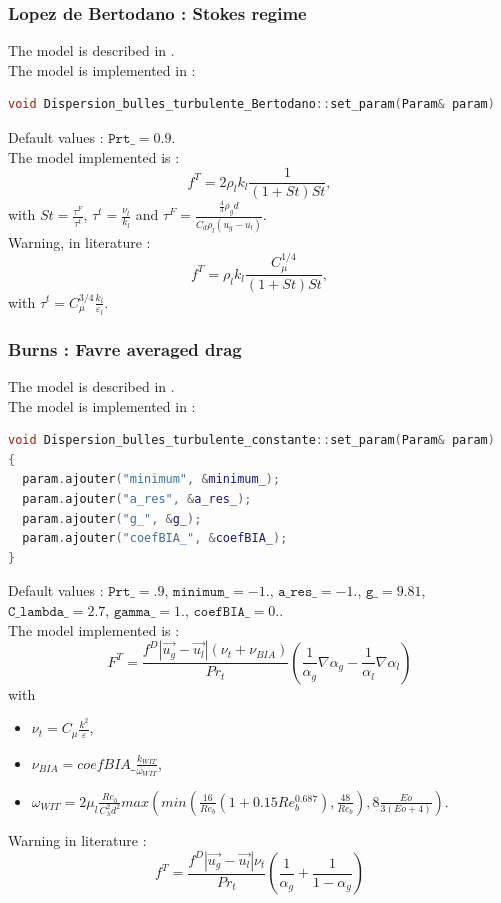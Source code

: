 %
\subsubsection{Lopez de Bertodano : Stokes regime}
The model is described in \textcite{LOPEZDEBERTODANO199865}.\\
The model is implemented in :
\begin{lstlisting}[language=c++]
void Dispersion_bulles_turbulente_Bertodano::set_param(Param& param)
\end{lstlisting}
Default values : $\texttt{Prt\_} = 0.9$.\\
The model implemented is :
\begin{equation}
   f^{T}=2\rho_lk_l\frac{1}{(1+St)St},
\end{equation}
with $St=\frac{\tau^F}{\tau^t}$, $\tau^t=\frac{\nu_t}{k_l}$ and $\tau^F=\frac{\frac{4}{3}\rho_g d}{C_d\rho_l(u_g-u_l)}$.\\
{\color{red} Warning}, in literature :
\begin{equation}
   f^{T}=\rho_lk_l\frac{C_{\mu}^{1/4}}{(1+St)St},
\end{equation}
with $\tau^t=C_{\mu}^{3/4}\frac{k_l}{\varepsilon_l}$.

%
\subsubsection{Burns : Favre averaged drag}
The model is described in \textcite{burns2004favre}.\\
The model is implemented in :
\begin{lstlisting}[language=c++]
void Dispersion_bulles_turbulente_constante::set_param(Param& param)
{
  param.ajouter("minimum", &minimum_);
  param.ajouter("a_res", &a_res_);
  param.ajouter("g_", &g_);
  param.ajouter("coefBIA_", &coefBIA_);
}
\end{lstlisting}
Default values :  $\texttt{Prt\_} = .9 $, $\texttt{minimum\_} = -1.$, $\texttt{a\_res\_} = -1.$, $\texttt{g\_} = 9.81$, $\texttt{C\_lambda\_} = 2.7$, $\texttt{gamma\_} = 1.$, $\texttt{coefBIA\_} = 0.$.\\
The model implemented is :
\begin{equation}
   F^{T}=\frac{f^D|\vec{u_g}-\vec{u_l}|(\nu_t+\nu_{BIA})}{Pr_t}(\frac{1}{\alpha_g}\nabla \alpha_g-\frac{1}{\alpha_l}\nabla \alpha_l)
\end{equation}
with
\begin{itemize}
    \item[\small \textcolor{blue}{\ding{109}}]$\nu_t=C_\mu\frac{k^2}{\varepsilon}$,
    \item[\small \textcolor{blue}{\ding{109}}]$\nu_{BIA}=coefBIA\_ \frac{k_{WIT}}{\omega_{WIT}}$,
    \item[\small \textcolor{blue}{\ding{109}}]$\omega_{WIT}=2\mu_l \frac{Re_b}{C_{\lambda}^2 d^2}max(min(\frac{16}{Re_b}(1+0.15Re_b^{0.687}),\frac{48}{Re_b}),8\frac{Eo}{3(Eo+4)})$.
\end{itemize}
{\color{red} Warning} in literature :
\begin{equation}
   f^{T}=\frac{f^D|\vec{u_g}-\vec{u_l}|\nu_t}{Pr_t}(\frac{1}{\alpha_g}+\frac{1}{1-\alpha_g})
\end{equation}

